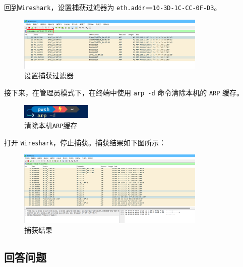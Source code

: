 \documentclass{article}
\begin{document}
回到\texttt{Wireshark}，设置捕获过滤器为 \texttt{eth.addr==10-3D-1C-CC-0F-D3}。

\begin{figure}[H]
  \centering
  \includegraphics[width=0.8\textwidth]{img/3.png}
  \caption{设置捕获过滤器}
  \label{fig:3}
\end{figure}

接下来，在管理员模式下，在终端中使用 \texttt{arp -d} 命令清除本机的 \texttt{ARP} 缓存。

\begin{figure}[H]
  \centering
  \includegraphics[width=0.3\textwidth]{img/4.png}
  \caption{清除本机\texttt{ARP}缓存}
  \label{fig:4}
\end{figure}

打开 \texttt{Wireshark}，停止捕获。捕获结果如下图所示：

\begin{figure}[H]
  \centering
  \includegraphics[width=0.8\textwidth]{img/5.png}
  \caption{捕获结果}
  \label{fig:5}
\end{figure}

\subsection{回答问题}
\end{document}
